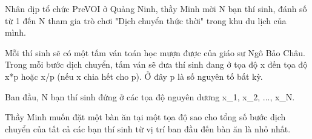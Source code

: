Nhân dịp tổ chức PreVOI ở Quảng Ninh, thầy Minh mời N bạn thí sinh, đánh số từ 1 đến N tham gia trò chơi "Dịch chuyển thức thời" trong khu du lịch của mình.

Mỗi thí sinh sẽ có một tấm ván toán học mượn được của giáo sư Ngô Bảo Châu. Trong mỗi bước dịch chuyển, tấm ván sẽ đưa thí sinh đang ở tọa độ x đến tọa độ x*p hoặc x/p (nếu x chia hết cho p). Ở đây p là số nguyên tố bất kỳ.

Ban đầu, N bạn thí sinh đứng ở các tọa độ nguyên dương x\_1, x\_2, ..., x\_N.

Thầy Minh muốn đặt một bàn ăn tại một tọa độ sao cho tổng số bước dịch chuyển của tất cả các bạn thí sinh từ vị trí ban đầu đến bàn ăn là nhỏ nhất.